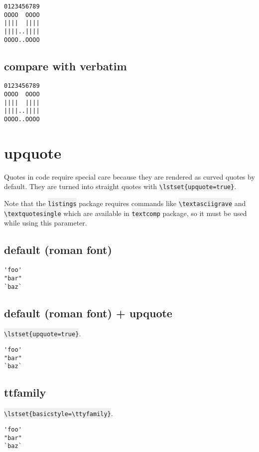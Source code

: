 \documentclass{article}
\newcommand{\bs}{\textbackslash}
\newcommand{\ttt}[1]{\colorbox[HTML]{f0f0f0}{\texttt{#1}}}
\begin{document}
{
\lstset{basicstyle=\ttfamily, columns=fullflexible, keepspaces=true}
\begin{lstlisting}
0123456789
OOOO  OOOO
||||  ||||
||||..||||
OOOO..OOOO
\end{lstlisting}
}

\subsection{compare with verbatim}
\begin{verbatim}
0123456789
OOOO  OOOO
||||  ||||
||||..||||
OOOO..OOOO
\end{verbatim}
\pagebreak


\section{upquote}
Quotes in code require special care because they are rendered as curved
quotes by default. They are turned into straight quotes with
\ttt{\bs{}lstset\{upquote=true\}}.

Note that the \ttt{listings} package requires commands like
\ttt{\bs{}textasciigrave} and \ttt{\bs{}textquotesingle} which are
available in \ttt{textcomp} package, so it must be used while using this
parameter.

\subsection{default (roman font)}
{
\begin{lstlisting}
'foo'
"bar"
`baz`
\end{lstlisting}
}

\subsection{default (roman font) + upquote}
\ttt{\bs{}lstset\{upquote=true\}}.

{
\lstset{upquote=true}
\begin{lstlisting}
'foo'
"bar"
`baz`
\end{lstlisting}
}

\subsection{ttfamily}
\ttt{\bs{}lstset\{basicstyle=\bs{}ttyfamily\}}.

{
\lstset{basicstyle=\ttfamily}
\begin{lstlisting}
'foo'
"bar"
`baz`
\end{lstlisting}
}
\end{document}
